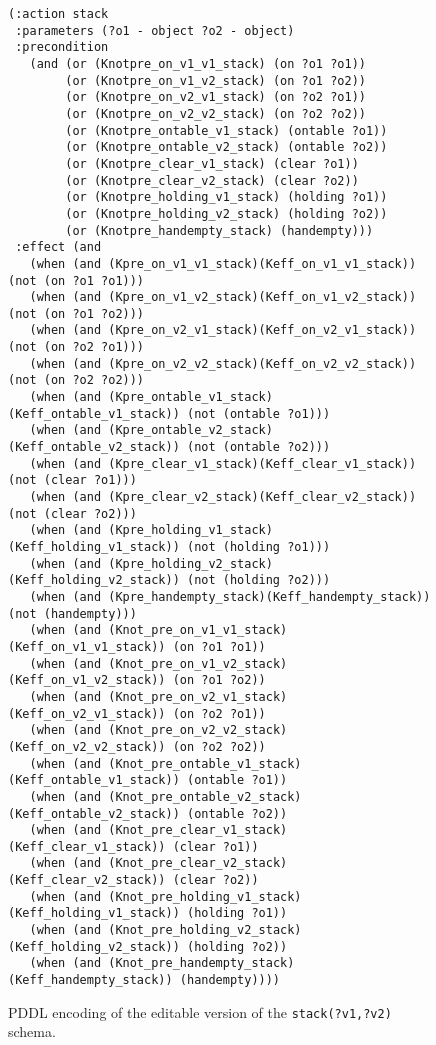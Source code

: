 \documentclass{article}
\begin{document}
\begin{figure}
  \begin{tiny}  
  \begin{verbatim}
(:action stack
 :parameters (?o1 - object ?o2 - object)
 :precondition
   (and (or (Knotpre_on_v1_v1_stack) (on ?o1 ?o1))
        (or (Knotpre_on_v1_v2_stack) (on ?o1 ?o2))
        (or (Knotpre_on_v2_v1_stack) (on ?o2 ?o1))
        (or (Knotpre_on_v2_v2_stack) (on ?o2 ?o2))
        (or (Knotpre_ontable_v1_stack) (ontable ?o1))
        (or (Knotpre_ontable_v2_stack) (ontable ?o2))
        (or (Knotpre_clear_v1_stack) (clear ?o1))
        (or (Knotpre_clear_v2_stack) (clear ?o2))
        (or (Knotpre_holding_v1_stack) (holding ?o1))
        (or (Knotpre_holding_v2_stack) (holding ?o2))
        (or (Knotpre_handempty_stack) (handempty)))
 :effect (and
   (when (and (Kpre_on_v1_v1_stack)(Keff_on_v1_v1_stack)) (not (on ?o1 ?o1)))
   (when (and (Kpre_on_v1_v2_stack)(Keff_on_v1_v2_stack)) (not (on ?o1 ?o2)))
   (when (and (Kpre_on_v2_v1_stack)(Keff_on_v2_v1_stack)) (not (on ?o2 ?o1)))
   (when (and (Kpre_on_v2_v2_stack)(Keff_on_v2_v2_stack)) (not (on ?o2 ?o2)))
   (when (and (Kpre_ontable_v1_stack)(Keff_ontable_v1_stack)) (not (ontable ?o1)))
   (when (and (Kpre_ontable_v2_stack)(Keff_ontable_v2_stack)) (not (ontable ?o2)))
   (when (and (Kpre_clear_v1_stack)(Keff_clear_v1_stack)) (not (clear ?o1)))
   (when (and (Kpre_clear_v2_stack)(Keff_clear_v2_stack)) (not (clear ?o2)))
   (when (and (Kpre_holding_v1_stack)(Keff_holding_v1_stack)) (not (holding ?o1)))
   (when (and (Kpre_holding_v2_stack)(Keff_holding_v2_stack)) (not (holding ?o2)))
   (when (and (Kpre_handempty_stack)(Keff_handempty_stack)) (not (handempty)))
   (when (and (Knot_pre_on_v1_v1_stack)(Keff_on_v1_v1_stack)) (on ?o1 ?o1))
   (when (and (Knot_pre_on_v1_v2_stack)(Keff_on_v1_v2_stack)) (on ?o1 ?o2))
   (when (and (Knot_pre_on_v2_v1_stack)(Keff_on_v2_v1_stack)) (on ?o2 ?o1))
   (when (and (Knot_pre_on_v2_v2_stack)(Keff_on_v2_v2_stack)) (on ?o2 ?o2))
   (when (and (Knot_pre_ontable_v1_stack)(Keff_ontable_v1_stack)) (ontable ?o1))
   (when (and (Knot_pre_ontable_v2_stack)(Keff_ontable_v2_stack)) (ontable ?o2))
   (when (and (Knot_pre_clear_v1_stack)(Keff_clear_v1_stack)) (clear ?o1))
   (when (and (Knot_pre_clear_v2_stack)(Keff_clear_v2_stack)) (clear ?o2))
   (when (and (Knot_pre_holding_v1_stack)(Keff_holding_v1_stack)) (holding ?o1))
   (when (and (Knot_pre_holding_v2_stack)(Keff_holding_v2_stack)) (holding ?o2))
   (when (and (Knot_pre_handempty_stack)(Keff_handempty_stack)) (handempty))))
  \end{verbatim}           
  \end{tiny}  
 \caption{\small PDDL encoding of the editable version of the {\tt\small stack(?v1,?v2)} schema.}
\label{fig:editable}
\end{figure}
\end{document}

